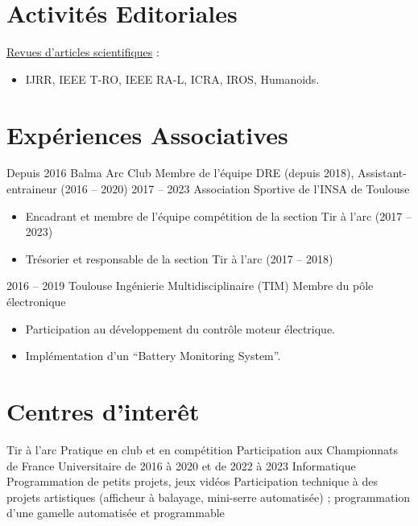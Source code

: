 \documentclass[11pt,a4paper,sans]{moderncv}         %
\newcommand{\items}{\item \hspace{2mm}}
\begin{document}
\section{Activit\'es  Editoriales}
\large{\underline{Revues d'articles scientifiques} :}
\begin{itemize}%
\items IJRR, IEEE T-RO, IEEE RA-L, ICRA, IROS, Humanoids.
\end{itemize}

\section{Exp\'eriences Associatives}
\cventry
{Depuis 2016}
{Balma Arc Club}
{Membre de l'\'equipe DRE (depuis 2018), Assistant-entraineur (2016 -- 2020)}
{}
{}
{}
%
\cventry
{2017 -- 2023}
{Association Sportive de l'INSA de Toulouse}
{}
{}
{}
{
  \begin{itemize}
    \item Encadrant et membre de l'\'equipe comp\'etition de la section Tir \`a l'arc (2017 -- 2023)
    \item Tr\'esorier et responsable de la section Tir \`a l'arc (2017 -- 2018)
  \end{itemize}
}
%
\cventry
{2016 -- 2019}
{Toulouse Ing\'enierie Multidisciplinaire (TIM)}
{Membre du p\^ole \'electronique}
{}
{}
{
  \begin{itemize}
    \item Participation au d\'eveloppement du contr\^ole moteur \'electrique.
    \item Impl\'ementation d'un ``Battery Monitoring System''.
  \end{itemize}
}
%

\section{Centres d'inter\^et}

\cventry
{Tir \`a l'arc}
{Pratique en club et en comp\'etition}
{Participation aux Championnats de France Universitaire de 2016 \`a 2020 et de 2022 \`a 2023}
{}
{}
{}
%
\cventry
{Informatique}
{Programmation de petits projets, jeux vid\'eos}
{Participation technique \`a des projets artistiques (afficheur \`a balayage, mini-serre automatis\'ee) ; programmation d'une gamelle automatis\'ee et programmable}
{}
{}
{}
%
\end{document}
